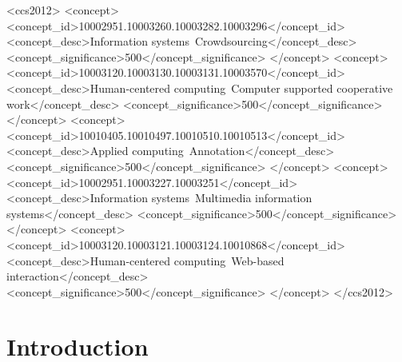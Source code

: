 \documentclass[sigconf]{acmart}
\begin{document}
\renewcommand{\shortauthors}{Marcello N. de Amorim et. al.}


\begin{abstract}
	
\end{abstract}

%
%
\begin{CCSXML}
<ccs2012>
<concept>
<concept_id>10002951.10003260.10003282.10003296</concept_id>
<concept_desc>Information systems~Crowdsourcing</concept_desc>
<concept_significance>500</concept_significance>
</concept>
<concept>
<concept_id>10003120.10003130.10003131.10003570</concept_id>
<concept_desc>Human-centered computing~Computer supported cooperative work</concept_desc>
<concept_significance>500</concept_significance>
</concept>
<concept>
<concept_id>10010405.10010497.10010510.10010513</concept_id>
<concept_desc>Applied computing~Annotation</concept_desc>
<concept_significance>500</concept_significance>
</concept>
<concept>
<concept_id>10002951.10003227.10003251</concept_id>
<concept_desc>Information systems~Multimedia information systems</concept_desc>
<concept_significance>500</concept_significance>
</concept>
<concept>
<concept_id>10003120.10003121.10003124.10010868</concept_id>
<concept_desc>Human-centered computing~Web-based interaction</concept_desc>
<concept_significance>500</concept_significance>
</concept>
</ccs2012>
\end{CCSXML}



\maketitle

\section{Introduction}
	
\end{document}

